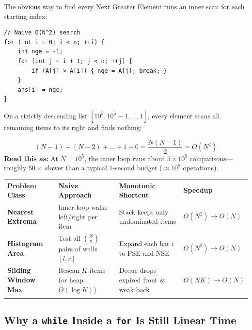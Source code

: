 \documentclass[11pt,a4paper]{article}
\theoremstyle{definition}
\begin{document}
The obvious way to find every Next Greater Element runs an inner scan for each starting index:
\begin{lstlisting}[numbers=none, xleftmargin=4pt, framexleftmargin=4pt]
// Naive O(N^2) search
for (int i = 0; i < n; ++i) {
    int nge = -1;
    for (int j = i + 1; j < n; ++j) {
        if (A[j] > A[i]) { nge = A[j]; break; }
    }
    ans[i] = nge;
}
\end{lstlisting}

On a strictly descending list $[10^5, 10^5 - 1, \dots, 1]$, every element scans all remaining items to its right and finds nothing:

\begin{formulabox}
$$
(N - 1) + (N - 2) + \dots + 1 + 0 = \frac{N(N - 1)}{2} = O(N^2)
$$
\textbf{Read this as:} At $N = 10^5$, the inner loop runs about $5 \times 10^9$ comparisons---roughly $50\times$ slower than a typical $1$-second budget ($\approx 10^8$ operations).
\end{formulabox}

\begin{center}
\begingroup
\small
{}
\begin{tabularx}{\textwidth}{>{\raggedright\arraybackslash\bfseries}p{3.2cm} >{\raggedright\arraybackslash}X >{\raggedright\arraybackslash}X >{\raggedright\arraybackslash\bfseries}p{2.4cm}}
\arrayrulecolor{primaryblue}\toprule[1.2pt]
\rowcolor{primaryblue!10}
\textcolor{primaryblue}{\textbf{Problem Class}} & \textcolor{primaryblue}{\textbf{Naive Approach}} & \textcolor{primaryblue}{\textbf{Monotonic Shortcut}} & \textcolor{primaryblue}{\textbf{Speedup}} \\
\arrayrulecolor{codeframe}\midrule[0.6pt]
Nearest Extrema & Inner loop walks left/right per item & Stack keeps only undominated items & $O(N^2) \to O(N)$ \\
Histogram Area & Test all $\binom{N}{2}$ pairs of walls $[l, r]$ & Expand each bar $i$ to $\text{PSE}$ and $\text{NSE}$ & $O(N^2) \to O(N)$ \\
Sliding Window Max & Rescan $K$ items (or heap $O(\log K)$) & Deque drops expired front \& weak back & $O(NK) \to O(N)$ \\
\arrayrulecolor{primaryblue}\bottomrule[1.2pt]
\end{tabularx}
\endgroup
\end{center}

\subsection{Why a \texttt{while} Inside a \texttt{for} Is Still Linear Time}
\end{document}

